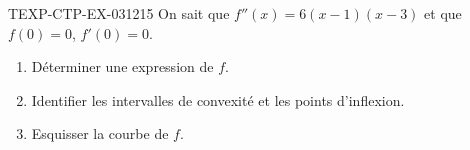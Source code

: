 \begin{exercice}{TEXP-CTP-EX-031}{2}{15}
On sait que $f''(x) = 6(x-1)(x-3)$ et que $f(0) = 0$, $f'(0) = 0$.
\begin{enumerate}
  \item Déterminer une expression de $f$.
  \item Identifier les intervalles de convexité et les points d'inflexion.
  \item Esquisser la courbe de $f$.
\end{enumerate}

\end{exercice}
